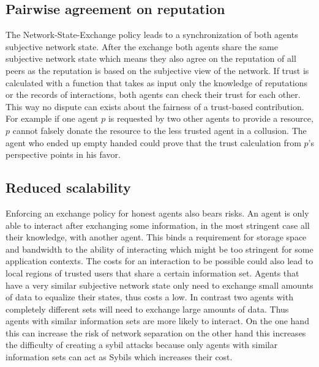 \subsection{Pairwise agreement on reputation}
The Network-State-Exchange policy leads to a synchronization of both agents subjective network state.
After the exchange both agents share the same subjective network state which means they also agree
on the reputation of all peers as the reputation is based on the subjective view of the network.
If trust is calculated with a function that takes as input only the knowledge of reputations or the
records of interactions, both agents can check their trust for each other. This way no dispute can 
exists about the fairness of a trust-based contribution. For example if one agent $p$ is requested by 
two other agents to provide a resource, $p$ cannot falsely donate the resource to the less 
trusted agent in a collusion. The agent who ended up empty handed could prove that the trust 
calculation from $p$'s perspective points in his favor.

\subsection{Reduced scalability}
Enforcing an exchange policy for honest agents also bears risks. An agent is only able to interact
after exchanging some information, in the most stringent case all their knowledge, with another agent. 
This binds a requirement for storage space and bandwidth to the ability of interacting which might 
be too stringent for some application contexts. The costs for an interaction to be possible could 
also lead to local regions of trusted users that share a certain information set. Agents that have
a very similar subjective network state only need to exchange small amounts of data to equalize their
states, thus costs a low. In contrast two agents with completely different sets will need to
exchange large amounts of data. Thus agents with similar information sets are more likely to interact.
On the one hand this can increase the risk of network separation on the other hand this increases 
the difficulty of creating a sybil attacks because only agents with similar information sets can 
act as Sybils which increases their cost.

